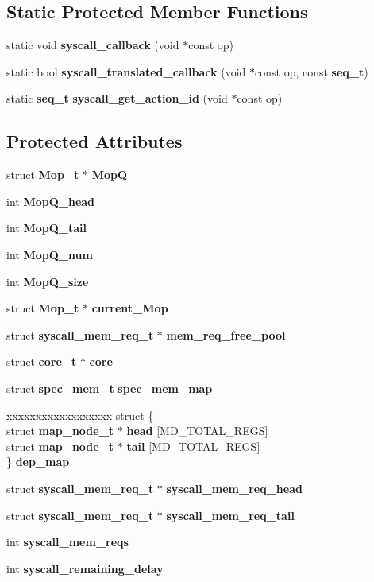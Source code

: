 \subsection*{Static Protected Member Functions}
\begin{CompactItemize}
\item 
static void {\bf syscall\_\-callback} (void $\ast$const op)
\item 
static bool {\bf syscall\_\-translated\_\-callback} (void $\ast$const op, const {\bf seq\_\-t})
\item 
static {\bf seq\_\-t} {\bf syscall\_\-get\_\-action\_\-id} (void $\ast$const op)
\end{CompactItemize}
\subsection*{Protected Attributes}
\begin{CompactItemize}
\item 
struct {\bf Mop\_\-t} $\ast$ {\bf MopQ}
\item 
int {\bf MopQ\_\-head}
\item 
int {\bf MopQ\_\-tail}
\item 
int {\bf MopQ\_\-num}
\item 
int {\bf MopQ\_\-size}
\item 
struct {\bf Mop\_\-t} $\ast$ {\bf current\_\-Mop}
\item 
struct {\bf syscall\_\-mem\_\-req\_\-t} $\ast$ {\bf mem\_\-req\_\-free\_\-pool}
\item 
struct {\bf core\_\-t} $\ast$ {\bf core}
\item 
struct {\bf spec\_\-mem\_\-t} {\bf spec\_\-mem\_\-map}
\item 
\begin{tabbing}
xx\=xx\=xx\=xx\=xx\=xx\=xx\=xx\=xx\=\kill
struct \{\\
\>struct {\bf map\_node\_t} $\ast$ {\bf head} [MD\_TOTAL\_REGS]\\
\>struct {\bf map\_node\_t} $\ast$ {\bf tail} [MD\_TOTAL\_REGS]\\
\} {\bf dep\_map}\\

\end{tabbing}\item 
struct {\bf syscall\_\-mem\_\-req\_\-t} $\ast$ {\bf syscall\_\-mem\_\-req\_\-head}
\item 
struct {\bf syscall\_\-mem\_\-req\_\-t} $\ast$ {\bf syscall\_\-mem\_\-req\_\-tail}
\item 
int {\bf syscall\_\-mem\_\-reqs}
\item 
int {\bf syscall\_\-remaining\_\-delay}
\end{CompactItemize}
